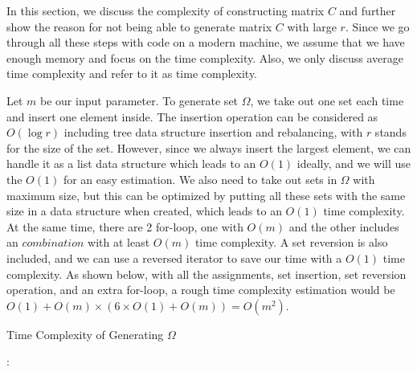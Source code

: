 \documentclass[11pt]{article}
\begin{document}
In this section, we discuss the complexity of constructing matrix $C$ and further show the reason for not being able to generate matrix $C$ with large $r$. Since we go through all these steps with code on a modern machine, we assume that we have enough memory and focus on the time complexity. Also, we only discuss average time complexity and refer to it as time complexity.

Let $m$ be our input parameter. To generate set $\Omega$, we take out one set each time and insert one element inside. The insertion operation can be considered as $O(\log r)$\cite{doi:10.1137/S0097539791218202} including tree data structure insertion and rebalancing, with $r$ stands for the size of the set. However, since we always insert the largest element, we can handle it as a list data structure which leads to an $O(1)$ ideally, and we will use the $O(1)$ for an easy estimation. We also need to take out sets in $\Omega$ with maximum size, but this can be optimized by putting all these sets with the same size in a data structure when created, which leads to an $O(1)$ time complexity. At the same time, there are 2 for-loop, one with $O(m)$ and the other includes an $combination$ with at least $O(m)$ time complexity. A set reversion is also included, and we can use a reversed iterator to save our time with a $O(1)$ time complexity. As shown below, with all the assignments, set insertion, set reversion operation, and an extra for-loop, a rough time complexity estimation would be $O(1) + O(m) \times (6 \times O(1) + O(m)) = O(m^2)$.

\begin{algorithm}[H] 
    \caption{Time Complexity of Generating $\Omega$}
    \label{alg:loop_tc}
    \begin{algorithmic}[1]
    \Ensure{$\Omega$}
       
         
                      
             
                 
                : 
                     
                \EndIf
                 
                     
                \EndFor
            \EndFor
        \EndFor
        \State \Return {$\Omega$}
    \end{algorithmic}
\end{algorithm}
\end{document}
